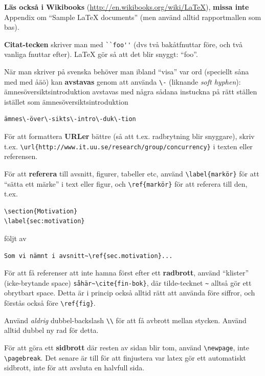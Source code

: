 \documentclass[swedish, a4paper,12pt]{article}
\begin{document}
\textbf{Läs också i Wikibooks} (\url{http://en.wikibooks.org/wiki/LaTeX}), \textbf{missa inte} Appendix om ``Sample LaTeX documents'' (men använd alltid rapportmallen som bas).

\textbf{Citat-tecken} skriver man med \verb|``foo''| (dvs två bakåtfnuttar före, och två vanliga fnuttar efter). LaTeX gör så att det blir snyggt: ``foo''.

När man skriver på svenska behöver man ibland ``visa'' var ord (speciellt såna med med åäö) kan \textbf{avstavas} genom att använda \verb|\-| (liknande \textit{soft hyphen}): ämnesöversiktsintroduktion avstavas med några sådana instuckna på rätt ställen istället som ämnes\-över\-sikts\-intro\-duk\-tion

\begin{verbatim}
ämnes\-över\-sikts\-intro\-duk\-tion
\end{verbatim}

För att formattera \textbf{URLer} bättre (så att t.ex. radbrytning blir snyggare), skriv t.ex. \verb|\url{http://www.it.uu.se/research/group/concurrency}| i texten eller referensen.

För att \textbf{referera} till avsnitt, figurer, tabeller etc, använd \verb|\label{markör}| för att ``sätta ett märke'' i text eller figur, och \verb|\ref{markör}| för att referera till den, t.ex.
\begin{verbatim}
\section{Motivation}
\label{sec:motivation}
\end{verbatim}

följt av
\begin{verbatim}
Som vi nämnt i avsnitt~\ref{sec.motivation}...
\end{verbatim}

För att få referenser att inte hamna först efter ett \textbf{radbrott}, använd ``klister'' (icke-brytande space) \verb|såhär~\cite{fin-bok}|, där tilde-tecknet \verb|~| alltså gör ett obrytbart space. Detta är i princip också alltid rätt att använda före siffror, och förstås också före \verb|\ref{fig}|.

Använd \emph{aldrig} dubbel-backslash \verb|\\| för att få avbrott mellan stycken. Använd alltid dubbel ny rad för detta.

För att göra ett \textbf{sidbrott} där resten av sidan blir tom, använd \verb|\newpage|, inte \verb|\pagebreak|. Det senare är till för att finjustera var latex gör ett automatiskt sidbrott, inte för att avsluta en halvfull sida.
\end{document}
